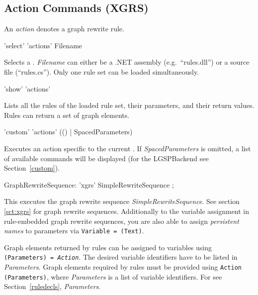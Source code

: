 \subsection{Action Commands (XGRS)}
\label{grsthings}
An \emph{action} denotes a graph rewrite rule.

\begin{rail}
  'select' 'actions' Filename
\end{rail}
Selects a .
\emph{Filename} can either be a .NET assembly (e.g.\ ``rules.dll'') or a source file (``rules.cs'').
Only one rule set can be loaded simultaneously.

\begin{rail}
  'show' 'actions'
\end{rail}
Lists all the rules of the loaded rule set, their parameters, and their return values.
Rules can return a set of graph elements.

\begin{rail}
  'custom' 'actions' (() | SpacedParameters)
\end{rail}
Executes an action specific to the current . 
If \emph{SpacedParameters} is omitted, a list of available commands will be displayed (for the LGSPBackend see Section~\ref{custom}).

\makeatletter
\begin{rail}
  GraphRewriteSequence: 'xgrs' SimpleRewriteSequence ;
\end{rail}
This executes the graph rewrite sequence \emph{SimpleRewriteSequence}.
See section \ref{sct:xgrs} for graph rewrite sequences.
Additionally to the variable assignment in rule-embedded graph rewrite sequences, you are also able to assign \emph{persistent names} to parameters via  \texttt{Variable = \@(Text)}.

Graph elements returned by rules can be assigned to variables using \texttt{(Para\-meters) = \emph{Action}}. 
The desired variable identifiers have to be listed in \emph{Parameters}. 
Graph elements required by rules must be provided using \texttt{Action (Para\-meters)}, where \emph{Parameters} is a list of variable identifiers. 
For  see Section~\ref{ruledecls}, \emph{Parameters}.

